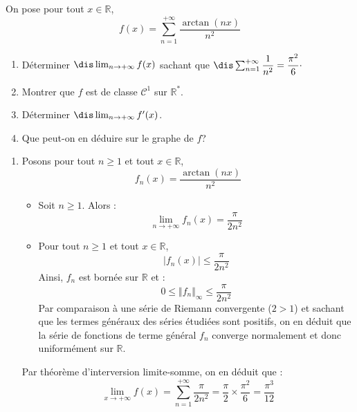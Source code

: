 \documentclass[a4paper,10pt]{report}
\begin{document}
\begin{Exa} On pose pour tout $x \in \mathbb{R}$,
$$ f(x) = \sum_{n=1}^{+ \infty} \dfrac{\arctan(nx)}{n^2}$$
\begin{enumerate}
\item Déterminer $\dis \lim_{n \rightarrow + \infty} f(x)$ sachant que $\dis \sum_{n=1}^{+ \infty} \dfrac{1}{n^2} = \dfrac{\pi^2}{6} \cdot$
\item Montrer que $f$ est de classe $\mathcal{C}^1$ sur $\mathbb{R}^*$.
\item Déterminer $\dis \lim_{n \rightarrow + \infty} f'(x)$.
\item Que peut-on en déduire sur le graphe de $f$?
\end{enumerate}
\end{Exa}

\corr \begin{enumerate}
\item Posons pour tout $n \geq 1$ et tout $x \in \mathbb{R}$,
$$ f_n(x) =  \dfrac{\arctan(nx)}{n^2}$$
\begin{itemize}
\item Soit $n \geq 1$. Alors :
$$ \lim_{n \rightarrow + \infty} f_n(x) = \dfrac{\pi}{2 n^2} $$
\item Pour tout $n \geq 1$ et tout $x \in \mathbb{R}$,
$$ \vert f_n(x) \vert \leq \dfrac{\pi}{2n^2}$$
Ainsi, $f_n$ est bornée sur $\mathbb{R}$ et :
$$ 0 \leq \Vert f_n \Vert_{ \infty} \leq \dfrac{\pi}{2n^2}$$
Par comparaison à une série de Riemann convergente ($2>1$) et sachant que les termes généraux des séries étudiées sont positifs, on en déduit que la série de fonctions de terme général $f_n$ converge normalement et donc uniformément sur $\mathbb{R}$.
\end{itemize}
Par théorème d'interversion limite-somme, on en déduit que :
$$ \lim_{x \rightarrow + \infty} f(x) = \sum_{n=1}^{+ \infty} \dfrac{\pi}{2n^2} = \dfrac{\pi}{2} \times \dfrac{\pi^2}{6} = \dfrac{\pi^3}{12}$$


\end{enumerate}
\end{document}
